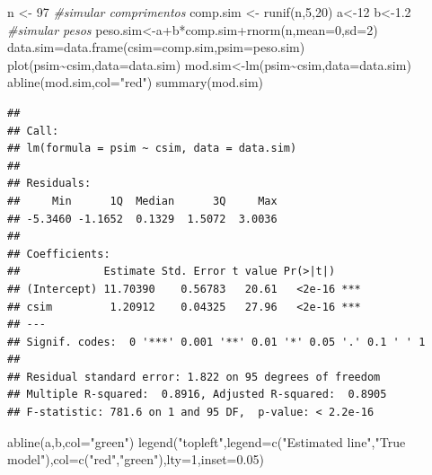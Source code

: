 \documentclass[
]{book}
\newenvironment{Shaded}{\begin{snugshade}}{\end{snugshade}}
\newcommand{\AttributeTok}[1]{\textcolor[rgb]{0.77,0.63,0.00}{#1}}
\newcommand{\CommentTok}[1]{\textcolor[rgb]{0.56,0.35,0.01}{\textit{#1}}}
\newcommand{\DecValTok}[1]{\textcolor[rgb]{0.00,0.00,0.81}{#1}}
\newcommand{\FloatTok}[1]{\textcolor[rgb]{0.00,0.00,0.81}{#1}}
\newcommand{\FunctionTok}[1]{\textcolor[rgb]{0.00,0.00,0.00}{#1}}
\newcommand{\NormalTok}[1]{#1}
\newcommand{\OtherTok}[1]{\textcolor[rgb]{0.56,0.35,0.01}{#1}}
\newcommand{\SpecialCharTok}[1]{\textcolor[rgb]{0.00,0.00,0.00}{#1}}
\newcommand{\StringTok}[1]{\textcolor[rgb]{0.31,0.60,0.02}{#1}}
\begin{document}
\begin{Shaded}
\begin{Highlighting}[]
\NormalTok{n }\OtherTok{\textless{}{-}} \DecValTok{97}
\CommentTok{\#simular comprimentos}
\NormalTok{comp.sim }\OtherTok{\textless{}{-}} \FunctionTok{runif}\NormalTok{(n,}\DecValTok{5}\NormalTok{,}\DecValTok{20}\NormalTok{)}
\NormalTok{a}\OtherTok{\textless{}{-}}\DecValTok{12}
\NormalTok{b}\OtherTok{\textless{}{-}}\FloatTok{1.2}
\CommentTok{\#simular pesos}
\NormalTok{peso.sim}\OtherTok{\textless{}{-}}\NormalTok{a}\SpecialCharTok{+}\NormalTok{b}\SpecialCharTok{*}\NormalTok{comp.sim}\SpecialCharTok{+}\FunctionTok{rnorm}\NormalTok{(n,}\AttributeTok{mean=}\DecValTok{0}\NormalTok{,}\AttributeTok{sd=}\DecValTok{2}\NormalTok{)}
\NormalTok{data.sim}\OtherTok{=}\FunctionTok{data.frame}\NormalTok{(}\AttributeTok{csim=}\NormalTok{comp.sim,}\AttributeTok{psim=}\NormalTok{peso.sim)}
\FunctionTok{plot}\NormalTok{(psim}\SpecialCharTok{\textasciitilde{}}\NormalTok{csim,}\AttributeTok{data=}\NormalTok{data.sim)}
\NormalTok{mod.sim}\OtherTok{\textless{}{-}}\FunctionTok{lm}\NormalTok{(psim}\SpecialCharTok{\textasciitilde{}}\NormalTok{csim,}\AttributeTok{data=}\NormalTok{data.sim)}
\FunctionTok{abline}\NormalTok{(mod.sim,}\AttributeTok{col=}\StringTok{"red"}\NormalTok{)}
\FunctionTok{summary}\NormalTok{(mod.sim)}
\end{Highlighting}
\end{Shaded}

\begin{verbatim}
## 
## Call:
## lm(formula = psim ~ csim, data = data.sim)
## 
## Residuals:
##     Min      1Q  Median      3Q     Max 
## -5.3460 -1.1652  0.1329  1.5072  3.0036 
## 
## Coefficients:
##             Estimate Std. Error t value Pr(>|t|)    
## (Intercept) 11.70390    0.56783   20.61   <2e-16 ***
## csim         1.20912    0.04325   27.96   <2e-16 ***
## ---
## Signif. codes:  0 '***' 0.001 '**' 0.01 '*' 0.05 '.' 0.1 ' ' 1
## 
## Residual standard error: 1.822 on 95 degrees of freedom
## Multiple R-squared:  0.8916, Adjusted R-squared:  0.8905 
## F-statistic: 781.6 on 1 and 95 DF,  p-value: < 2.2e-16
\end{verbatim}

\begin{Shaded}
\begin{Highlighting}[]
\FunctionTok{abline}\NormalTok{(a,b,}\AttributeTok{col=}\StringTok{"green"}\NormalTok{)}
\FunctionTok{legend}\NormalTok{(}\StringTok{"topleft"}\NormalTok{,}\AttributeTok{legend=}\FunctionTok{c}\NormalTok{(}\StringTok{"Estimated line"}\NormalTok{,}\StringTok{"True model"}\NormalTok{),}\AttributeTok{col=}\FunctionTok{c}\NormalTok{(}\StringTok{"red"}\NormalTok{,}\StringTok{"green"}\NormalTok{),}\AttributeTok{lty=}\DecValTok{1}\NormalTok{,}\AttributeTok{inset=}\FloatTok{0.05}\NormalTok{)}
\end{Highlighting}
\end{Shaded}
\end{document}
